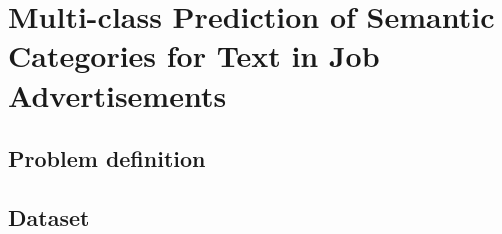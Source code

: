 
\clearpage

\section{Multi-class Prediction of Semantic Categories for Text in Job Advertisements}
\label{sec:Multi-class Prediction of Semantic Categories for Text in Job Advertisements}

\subsection{Problem definition}

\subsection{Dataset}

